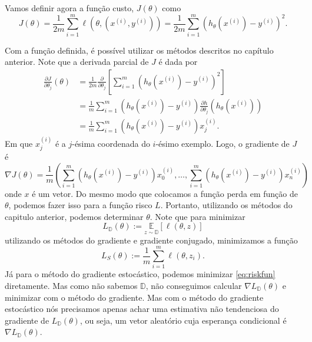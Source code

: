\documentclass[
	12pt,				%
    oneside,			%
	a4paper,			%
	english,			%
	french,				%
	spanish,			%
	brazil,				%
	]{abntex2}
\begin{document}
            Vamos definir agora a função custo, $J(\theta)$ como
            \begin{equation*}
                J(\theta) = \frac{1}{2m}\sum_{i=1}^{m}\ell(\theta,(x^{(i)},y^{(i)})) = \frac{1}{2m}\sum_{i=1}^{m}(h_\theta(x^{(i)})- y^{(i)})^2.
            \end{equation*}

            Com a função definida, é possível utilizar os métodos descritos no capítulo anterior. Note que a derivada parcial de $J$ é dada por
            \begin{equation}
                \label{eq:gdcost}
                \begin{split}
                    \frac{\partial J}{\partial \theta_j}(\theta) &= \frac{1}{2m}\frac{\partial}{\partial \theta_j}\left [\sum_{i=1}^{m}(h_\theta(x^{(i)}) - y^{(i)})^2\right ] \\
                    &= \frac{1}{m}\sum_{i=1}^{m}(h_\theta(x^{(i)}) - y^{(i)})\frac{\partial h}{\partial \theta_j}(h_\theta(x^{(i)})) \\
                    &=\frac{1}{m}\sum_{i=1}^{m}(h_\theta(x^{(i)}) - y^{(i)})x^{(i)}_j.
                \end{split}
            \end{equation}
            Em que $x^{(i)}_j$ é a $j$-ésima coordenada do $i$-ésimo exemplo. Logo, o gradiente de $J$ é
            \begin{equation*}
                \nabla J(\theta) = \frac{1}{m}\left(\sum_{i=1}^{m}(h_\theta(x^{(i)}) - y^{(i)})x^{(i)}_0,\dots,\sum_{i=1}^{m}(h_\theta(x^{(i)}) - y^{(i)})x^{(i)}_n \right)
            \end{equation*}
            onde $x$ é um vetor.
            Do mesmo modo que colocamos a função perda em função de $\theta$, podemos fazer isso para a função risco $L$. Portanto, utilizando os métodos do capitulo anterior, podemos determinar $\theta$. Note que para minimizar \begin{equation}\label{eq:riskfun}
                    L_{\mathbb{D}}(\theta) := \underset{z\sim \mathbb{D}}{\mathbb{E}}[\ell(\theta,z)]
            \end{equation}
            utilizando os métodos do gradiente e gradiente conjugado, minimizamos a função
            \begin{equation*}
                     L_S(\theta) := \frac{1}{m}\sum_{i=1}^{m}\ell(\theta,z_i).
            \end{equation*}
            Já para o método do gradiente estocástico, podemos minimizar \eqref{eq:riskfun} diretamente. Mas como não sabemos $\mathbb{D}$, não conseguimos calcular $\nabla L_\mathbb{D}(\theta)$ e minimizar com o método do gradiente. Mas com o método do gradiente estocástico nós precisamos apenas achar uma estimativa não tendenciosa do gradiente de $L_\mathbb{D}(\theta)$, ou seja, um vetor aleatório cuja esperança condicional é $\nabla L_\mathbb{D}(\theta)$.
\end{document}
